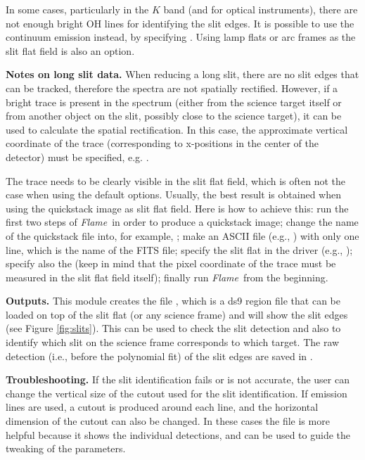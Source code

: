 \documentclass[a4paper]{article}
\newcommand{\flame}{\emph{Flame}}
\begin{document}
\begin{sloppypar}
In some cases, particularly in the $K$ band (and for optical instruments), there are not enough bright OH lines for identifying the slit edges. It is possible to use the continuum emission instead, by specifying . Using lamp flats or arc frames as the slit flat field is also an option.

\medskip
\noindent
\textbf{Notes on long slit data.} When reducing a long slit, there are no slit edges that can be tracked, therefore the spectra are not spatially rectified. However, if a bright trace is present in the spectrum (either from the science target itself or from another object on the slit, possibly close to the science target), it can be used to calculate the spatial rectification. In this case, the approximate vertical coordinate of the trace (corresponding to x-positions in the center of the detector) must be specified, e.g. .

The trace needs to be clearly visible in the slit flat field, which is often not the case when using the default options. Usually, the best result is obtained when using the quickstack image as slit flat field. Here is how to achieve this: run the first two steps of \flame\ in order to produce a quickstack image; change the name of the quickstack file into, for example, ; make an ASCII file (e.g., ) with only one line, which is the name of the FITS file; specify the slit flat in the driver (e.g., ); specify also the  (keep in mind that the pixel coordinate of the trace must be measured in the slit flat field itself); finally run \flame\ from the beginning.

\medskip
\noindent
\textbf{Outputs.} This module creates the file , which is a ds9 region file that can be loaded on top of the slit flat (or any science frame) and will show the slit edges (see Figure \ref{fig:slits}). This can be used to check the slit detection and also to identify which slit on the science frame corresponds to which target. The raw detection (i.e., before the polynomial fit) of the slit edges are saved in .

\medskip
\noindent
\textbf{Troubleshooting.} If the slit identification fails or is not accurate, the user can change the vertical size of the cutout used for the slit identification. If emission lines are used, a cutout is produced around each line, and the horizontal dimension of the cutout can also be changed. In these cases the  file is more helpful because it shows the individual detections, and can be used to guide the tweaking of the parameters.


\end{sloppypar}
\end{document}
